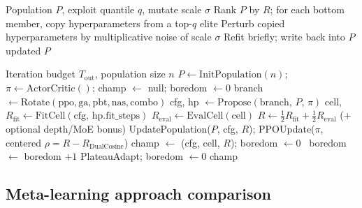 \begin{algorithm}[t]
\caption{PBT exploit--mutate}
\label{alg:pbt}
\begin{algorithmic}[1]
\Require Population $P$, exploit quantile $q$, mutate scale $\sigma$
\State Rank $P$ by $R$; for each bottom member, copy hyperparameters from a top-$q$ elite
\State Perturb copied hyperparameters by multiplicative noise of scale $\sigma$
\State Refit briefly; write back into $P$
\State \Return updated $P$
\end{algorithmic}
\end{algorithm}

\begin{algorithm}[t]
\caption{HybridMetaSearch}
\label{alg:hybrid}
\begin{algorithmic}[1]
\Require Iteration budget $T_{\mathrm{out}}$, population size $n$
\State $P \gets \mathrm{InitPopulation}(n)$; $\pi \gets \mathrm{ActorCritic}()$; champ $\gets$ null; boredom $\gets 0$
  \State branch $\gets \mathrm{Rotate}(\mathrm{ppo},\mathrm{ga},\mathrm{pbt},\mathrm{nas},\mathrm{combo})$
  \State cfg, hp $\gets \mathrm{Propose}(\mathrm{branch},\,P,\,\pi)$
  \State cell, $R_{\mathrm{fit}} \gets \mathrm{FitCell}(\mathrm{cfg},\,\mathrm{hp.fit\_steps})$
  \State $R_{\mathrm{eval}} \gets \mathrm{EvalCell}(\mathrm{cell})$
  \State $R \gets \tfrac12 R_{\mathrm{fit}} + \tfrac12 R_{\mathrm{eval}}$ (+ optional depth/MoE bonus)
  \State UpdatePopulation($P$, cfg, $R$); PPOUpdate($\pi$, centered $\rho = R - R_{\mathrm{DualCosine}}$)
   champ $\gets$ (cfg, cell, $R$); boredom $\gets 0$
  \Else\ boredom $\gets$ boredom $+1$
  \EndIf
   PlateauAdapt; boredom $\gets 0$
  \EndIf
\EndFor
\State \Return champ
\end{algorithmic}
\end{algorithm}

\subsection{Meta-learning approach comparison}
\label{sec:meta-compare}

